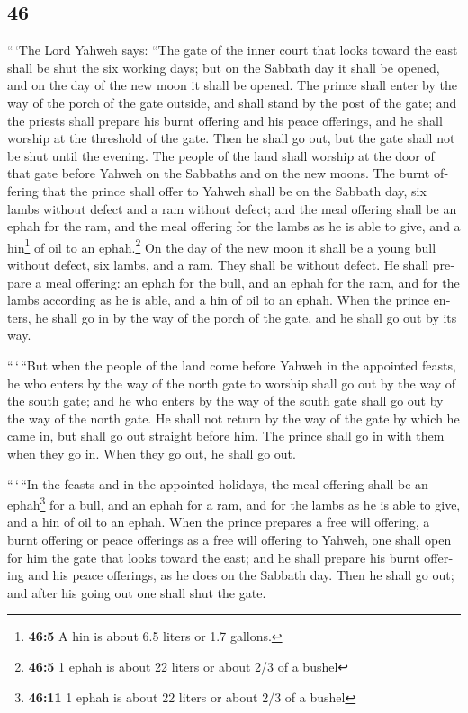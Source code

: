 \begin{paracol}{2}
\begin{otherlanguage}{english}
\hypertarget{section-91}{%
\section{46}\label{section-91}}

 ``\,`The Lord Yahweh says: ``The gate of the inner court
that looks toward the east shall be shut the six working days; but on
the Sabbath day it shall be opened, and on the day of the new moon it
shall be opened.  The prince shall enter by the way of the
porch of the gate outside, and shall stand by the post of the gate; and
the priests shall prepare his burnt offering and his peace offerings,
and he shall worship at the threshold of the gate. Then he shall go out,
but the gate shall not be shut until the evening.  The
people of the land shall worship at the door of that gate before Yahweh
on the Sabbaths and on the new moons.  The burnt offering
that the prince shall offer to Yahweh shall be on the Sabbath day, six
lambs without defect and a ram without defect;  and the
meal offering shall be an ephah for the ram, and the meal offering for
the lambs as he is able to give, and a hin\footnote{\textbf{46:5} A hin
  is about 6.5 liters or 1.7 gallons.} of oil to an ephah.\footnote{\textbf{46:5}
  1 ephah is about 22 liters or about 2/3 of a bushel}  On
the day of the new moon it shall be a young bull without defect, six
lambs, and a ram. They shall be without defect.  He shall
prepare a meal offering: an ephah for the bull, and an ephah for the
ram, and for the lambs according as he is able, and a hin of oil to an
ephah.  When the prince enters, he shall go in by the way
of the porch of the gate, and he shall go out by its way.

 ``\,`\,``But when the people of the land come before
Yahweh in the appointed feasts, he who enters by the way of the north
gate to worship shall go out by the way of the south gate; and he who
enters by the way of the south gate shall go out by the way of the north
gate. He shall not return by the way of the gate by which he came in,
but shall go out straight before him.  The prince shall
go in with them when they go in. When they go out, he shall go out.

 ``\,`\,``In the feasts and in the appointed holidays,
the meal offering shall be an ephah\footnote{\textbf{46:11} 1 ephah is
  about 22 liters or about 2/3 of a bushel} for a bull, and an ephah for
a ram, and for the lambs as he is able to give, and a hin of oil to an
ephah.  When the prince prepares a free will offering, a
burnt offering or peace offerings as a free will offering to Yahweh, one
shall open for him the gate that looks toward the east; and he shall
prepare his burnt offering and his peace offerings, as he does on the
Sabbath day. Then he shall go out; and after his going out one shall
shut the gate.


\end{otherlanguage}
\end{paracol}
